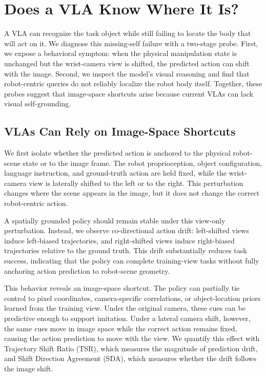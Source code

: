 \section{Does a VLA Know Where It Is?}

A VLA can recognize the task object while still failing to locate the body that
will act on it. We diagnose this missing-self failure with a two-stage probe.
First, we expose a behavioral symptom: when the physical manipulation state is
unchanged but the wrist-camera view is shifted, the predicted action can shift
with the image. Second, we inspect the model's visual reasoning and find that
robot-centric queries do not reliably localize the robot body itself. Together,
these probes suggest that image-space shortcuts arise because current VLAs can
lack visual self-grounding.

\subsection{VLAs Can Rely on Image-Space Shortcuts}

We first isolate whether the predicted action is anchored to the physical
robot-scene state or to the image frame. The robot proprioception, object
configuration, language instruction, and ground-truth action are held fixed,
while the wrist-camera view is laterally shifted to the left or to the right.
This perturbation changes where the scene appears in the image, but it does
not change the correct robot-centric action.

A spatially grounded policy should remain stable under this view-only
perturbation. Instead, we observe co-directional action drift: left-shifted
views induce left-biased trajectories, and right-shifted views induce
right-biased trajectories relative to the ground truth. This drift
substantially reduces task success, indicating that the policy can complete
training-view tasks without fully anchoring action prediction to robot-scene
geometry.

This behavior reveals an image-space shortcut. The policy can partially tie
control to pixel coordinates, camera-specific correlations, or object-location
priors learned from the training view. Under the original camera, these cues
can be predictive enough to support imitation. Under a lateral camera shift,
however, the same cues move in image space while the correct action remains
fixed, causing the action prediction to move with the view. We quantify this
effect with Trajectory Shift Ratio (TSR), which measures the magnitude of
prediction drift, and Shift Direction Agreement (SDA), which measures whether
the drift follows the image shift.

